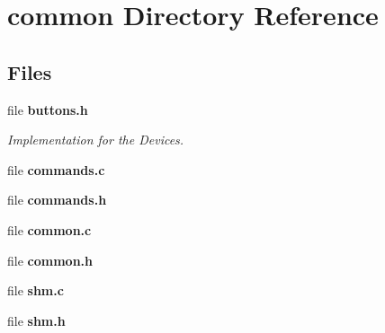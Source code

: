 \section{common Directory Reference}
\label{dir_bdd9a5d540de89e9fe90efdfc6973a4f}
\subsection*{Files}
\begin{DoxyCompactItemize}
\item 
file {\bf buttons.\-h}
\begin{DoxyCompactList}\small\item\em Implementation for the Devices. \end{DoxyCompactList}\item 
file {\bfseries commands.\-c}
\item 
file {\bfseries commands.\-h}
\item 
file {\bfseries common.\-c}
\item 
file {\bfseries common.\-h}
\item 
file {\bfseries shm.\-c}
\item 
file {\bfseries shm.\-h}
\end{DoxyCompactItemize}
